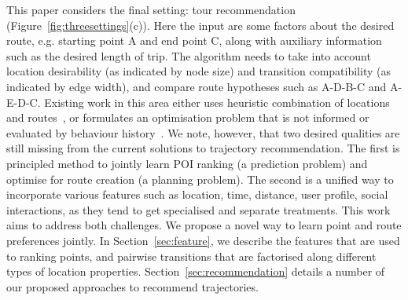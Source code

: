 This paper considers the final setting: tour recommendation (Figure~\ref{fig:threesettings}(c)). Here the input are some factors about the desired route, e.g. starting point A and end point C, along with auxiliary information such as the desired length of trip. The algorithm needs to take into account location desirability (as indicated by node size) and transition compatibility (as indicated by edge width), and compare route hypotheses such as A-D-B-C and A-E-D-C. Existing work in this area either uses heuristic combination of locations and routes~\cite{lu2010photo2trip,ijcai15,lu2012personalized}, or formulates an optimisation problem that is not informed or evaluated by behaviour history~\cite{gioniswsdm14,chen2015tripplanner}.
%
We note, however, that two desired qualities are still
missing from the current solutions to trajectory recommendation.
The first is principled method to jointly learn POI ranking (a prediction problem)
and optimise for route creation (a planning problem).
The second is a unified way to incorporate various features
such as location, time, distance, user profile, social interactions,
as they tend to get specialised and separate treatments.
This work aims to address both challenges. %
We propose a novel way to learn point and route preferences jointly.
In Section~\ref{sec:feature}, we describe the features that are used to ranking points,
and pairwise transitions that are factorised along %
different types of location properties.
Section~\ref{sec:recommendation} details a number of our proposed approaches to recommend trajectories.
